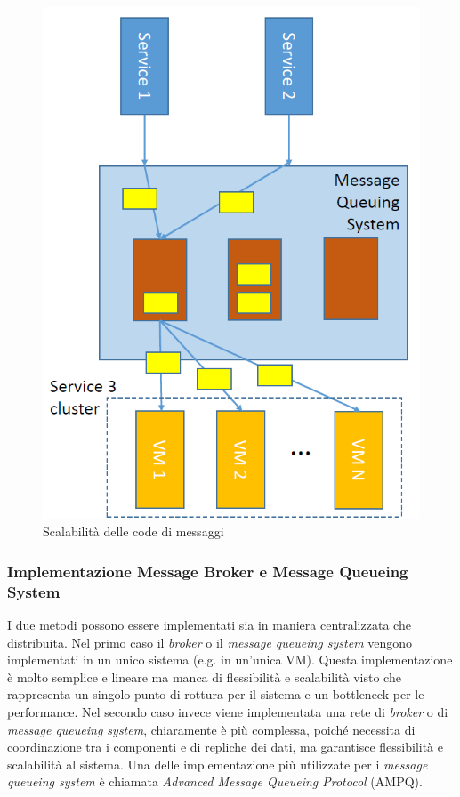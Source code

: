 \documentclass{article}
\begin{document}
\begin{figure}[H]
\centering
\includegraphics[scale=0.5]{img/ScalaMQS.PNG}
\caption{Scalabilità delle code di messaggi}
\end{figure}

\subsubsection{Implementazione Message Broker e Message Queueing System}
I due metodi possono essere implementati sia in maniera centralizzata che distribuita.
Nel primo caso il \textit{broker} o il \textit{message queueing system} vengono implementati in un unico sistema (e.g. in un'unica VM). Questa implementazione è molto semplice e lineare ma manca di flessibilità e scalabilità visto che rappresenta un singolo punto di rottura per il sistema e un bottleneck per le performance.
Nel secondo caso invece viene implementata una rete di \textit{broker} o di \textit{message queueing system}, chiaramente è più complessa, poiché necessita di coordinazione tra i componenti e di repliche dei dati, ma garantisce flessibilità e scalabilità al sistema. 
Una delle implementazione più utilizzate per i \textit{message queueing system} è chiamata \textit{Advanced Message Queueing Protocol} (AMPQ).
\end{document}
